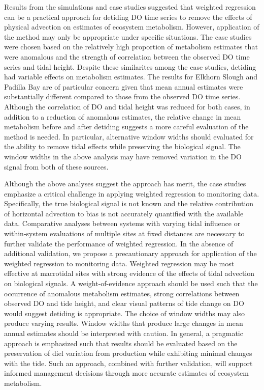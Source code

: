\documentclass[letterpaper,12pt,oneside]{article}\usepackage[]{graphicx}\usepackage[]{color}
\begin{document}
Results from the simulations and case studies suggested that weighted regression can be a practical approach for detiding \ac{DO} time series to remove the effects of physical advection on estimates of ecosystem metabolism.  However, application of the method may only be appropriate under specific situations.  The case studies were chosen based on the relatively high proportion of metabolism estimates that were anomalous and the strength of correlation between the observed \ac{DO} time series and tidal height.  Despite these similarites among the case studies, detiding had variable effects on metabolism estimates.  The results for Elkhorn Slough and Padilla Bay are of particular concern given that mean annual estimates were substantially different compared to those from the observed \ac{DO} time series.  Although the correlation of \ac{DO} and tidal height was reduced for both cases, in addition to a reduction of anomalous estimates, the relative change in mean metabolism before and after detiding suggests a more careful evaluation of the method is needed.  In particular, alternative window widths should evaluated for the ability to remove tidal effects while preserving the biological signal.  The window widths in the above analysis may have removed variation in the \ac{DO} signal from both of these sources.    

Although the above analyses suggest the approach has merit, the case studies emphasize a critical challenge in applying weighted regression to monitoring data. Specifically, the true biological signal is not known and the relative contribution of horizontal advection to bias is not accurately quantified with the available data.  Comparative analyses between systems with varying tidal influence or within-system evaluations of multiple sites at fixed distances are necessary to further validate the performance of weighted regression.  In the absence of additional validation, we propose a precautionary approach for application of the weighted regression to monitoring data.  Weighted regression may be most effective at macrotidal sites with strong evidence of the effects of tidal advection on biological signals.  A weight-of-evidence approach should be used such that the occurrence of anomalous metabolism estimates, strong correlations between observed \ac{DO} and tide height, and clear visual patterns of tide change on \ac{DO} would suggest detiding is appropriate.  The choice of window widths may also produce varying results.  Window widths that produce large changes in mean annual estimates should be interpreted with caution.  In general, a pragmatic approach is emphasized such that results should be evaluated based on the preservation of diel variation from production while exhibiting minimal changes with the tide.  Such an approach, combined with further validation, will support informed management decisions through more accurate estimates of ecosystem metabolism.  
\end{document}
